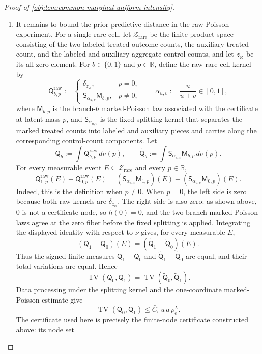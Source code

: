 \documentclass[11pt]{article}
\begin{document}
\begin{proof}[Proof of \cref{obj:lem:common-marginal-uniform-intensity}]
\begin{enumerate}
\item It remains to bound the prior-predictive distance in the raw Poisson experiment. For a single rare cell, let \(\mathcal Z_{\mathrm{rare}}\) be the finite product space consisting of the two labeled treated-outcome counts, the auxiliary treated count, and the labeled and auxiliary aggregate control counts, and let \(z_{\varnothing}\) be its all-zero element. For \(b\in\{0,1\}\) and \(p\in\mathbb R\), define the raw rare-cell kernel by
\[
\mathsf Q^{\mathrm{raw}}_{b,p}
:=
\begin{cases}
\delta_{z_{\varnothing}}, & p=0,\\
\mathsf S_{\alpha_{u,v}}\mathsf M_{b,p}, & p\ne0,
\end{cases}
\qquad
\alpha_{u,v}:=\frac{u}{u+v}\in[0,1],
\]
where \(\mathsf M_{b,p}\) is the branch-\(b\) marked-Poisson law associated with the certificate at latent mass \(p\), and \(\mathsf S_{\alpha_{u,v}}\) is the fixed splitting kernel that separates the marked treated counts into labeled and auxiliary pieces and carries along the corresponding control-count components. Let
\[
\mathsf Q_b:=\int \mathsf Q^{\mathrm{raw}}_{b,p}\,d\nu(p),
\qquad
\widetilde{\mathsf Q}_b
:=\int \mathsf S_{\alpha_{u,v}}\mathsf M_{b,p}\,d\nu(p).
\]
For every measurable event \(E\subseteq\mathcal Z_{\mathrm{rare}}\) and every \(p\in\mathbb R\),
\[
\mathsf Q^{\mathrm{raw}}_{1,p}(E)-\mathsf Q^{\mathrm{raw}}_{0,p}(E)
=
(\mathsf S_{\alpha_{u,v}}\mathsf M_{1,p})(E)
-(\mathsf S_{\alpha_{u,v}}\mathsf M_{0,p})(E).
\]
Indeed, this is the definition when \(p\ne0\). When \(p=0\), the left side is zero because both raw kernels are \(\delta_{z_{\varnothing}}\). The right side is also zero: as shown above, \(0\) is not a certificate node, so \(h(0)=0\), and the two branch marked-Poisson laws agree at the zero fiber before the fixed splitting is applied. Integrating the displayed identity with respect to \(\nu\) gives, for every measurable \(E\),
\[
(\mathsf Q_1-\mathsf Q_0)(E)
=
(\widetilde{\mathsf Q}_1-\widetilde{\mathsf Q}_0)(E).
\]
Thus the signed finite measures \(\mathsf Q_1-\mathsf Q_0\) and \(\widetilde{\mathsf Q}_1-\widetilde{\mathsf Q}_0\) are equal, and their total variations are equal. Hence
\[
\operatorname{TV}(\mathsf Q_0,\mathsf Q_1)
=
\operatorname{TV}(\widetilde{\mathsf Q}_0,\widetilde{\mathsf Q}_1).
\]
Data processing under the splitting kernel and the one-coordinate marked-Poisson estimate give
\[
\operatorname{TV}(\mathsf Q_0,\mathsf Q_1)
\le
\bar C_\epsilon\,u\,a\,\rho_\epsilon^L .
\]
The certificate used here is precisely the finite-node certificate constructed above: its node set

\end{enumerate}
\end{proof}
\end{document}
